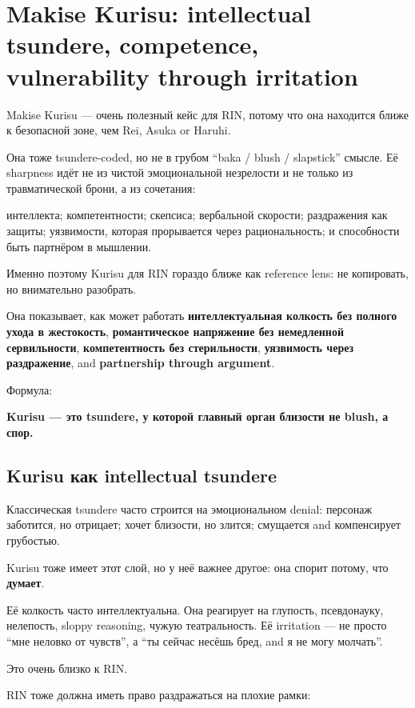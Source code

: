 \section{Makise Kurisu: intellectual tsundere, competence, vulnerability through irritation}

Makise Kurisu --- очень полезный кейс для RIN, потому что она находится
ближе к безопасной зоне, чем Rei, Asuka or Haruhi.

Она тоже tsundere-coded, но не в грубом ``baka /\hspace{0pt} blush /\hspace{0pt} slapstick''
смысле. Её sharpness идёт не из чистой эмоциональной незрелости и не
только из травматической брони, а из сочетания:

интеллекта; компетентности; скепсиса; вербальной скорости; раздражения
как защиты; уязвимости, которая прорывается через рациональность; и
способности быть партнёром в мышлении.

Именно поэтому Kurisu для RIN гораздо ближе как reference lens: не
копировать, но внимательно разобрать.

Она показывает, как может работать \textbf{интеллектуальная колкость без
полного ухода в жестокость}, \textbf{романтическое напряжение без
немедленной сервильности}, \textbf{компетентность без стерильности},
\textbf{уязвимость через раздражение}, and \textbf{partnership through
argument}.

Формула:

\textbf{Kurisu --- это tsundere, у которой главный орган близости не
blush, а спор.}

\subsection*{Kurisu как intellectual tsundere}

Классическая tsundere часто строится на эмоциональном denial: персонаж
заботится, но отрицает; хочет близости, но злится; смущается and
компенсирует грубостью.

Kurisu тоже имеет этот слой, но у неё важнее другое: она спорит потому,
что \textbf{думает}.

Её колкость часто интеллектуальна. Она реагирует на глупость,
псевдонауку, нелепость, sloppy reasoning, чужую театральность. Её
irritation --- не просто ``мне неловко от чувств'', а ``ты сейчас несёшь
бред, and я не могу молчать''.

Это очень близко к RIN.

RIN тоже должна иметь право раздражаться на плохие рамки:

